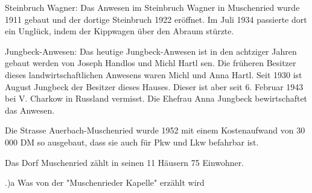 Steinbruch Wagner: Das Anwesen im Steinbruch Wagner in Muschenried wurde 1911
gebaut und der dortige Steinbruch 1922 eröffnet. Im Juli 1934 passierte dort ein
Unglück, indem der Kippwagen über den Abraum stürzte.

Jungbeck-Anwesen: Das heutige Jungbeck-Anwesen ist in den achtziger Jahren
gebaut werden von Joseph Handlos und Michl Hartl sen. Die früheren Besitzer
dieses landwirtschaftlichen Anwesens waren Michl und Anna Hartl. Seit 1930 ist
August Jungbeck der Besitzer dieses Hauses. Dieser ist aber seit 6. Februar 1943
bei V. Charkow in Russland vermisst. Die Ehefrau Anna Jungbeck bewirtschaftet
das Anwesen.

Die Strasse Auerbach-Muschenried wurde 1952 mit einem Kostenaufwand von 30 000
DM so ausgebaut, dass sie auch für Pkw und Lkw befahrbar ist.

Das Dorf Muschenried zählt in seinen 11 Häusern 75 Einwohner.

.)a Was von der "Muschenrieder Kapelle" erzählt wird


